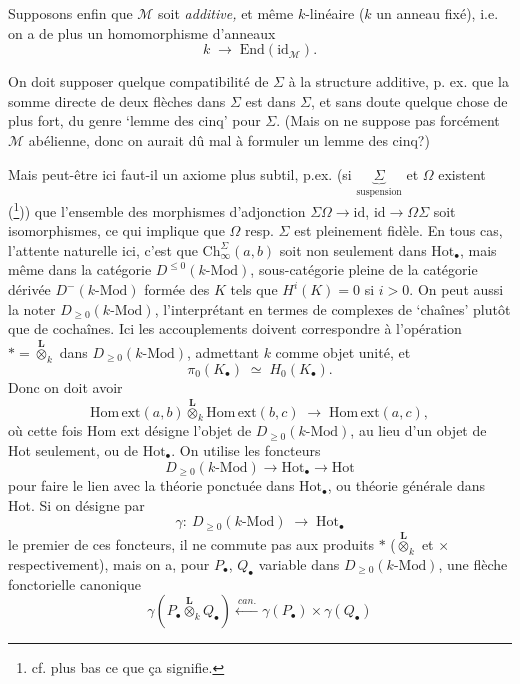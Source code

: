 \documentclass[11pt]{article}
\newcommand{\printedpage}[1]{\marginpar{\footnotesize p.~#1}}
\newcommand{\msp}[1]{\marginpar{\footnotesize [#1]}}
\newcommand{\Ch}{\mathrm{Ch}}
\newcommand{\Hot}{\mathrm{Hot}}
\newcommand{\M}{\mathcal{M}}
\newcommand{\Homext}{\mathrm{Hom\,ext}}
\newcommand{\Lotimes}{\overset{\mathbf{L}}{\otimes}}
\begin{document}
Supposons enfin que $\M$ soit \textit{additive,} et même $k$-linéaire ($k$ un anneau fixé), i.e. on a de plus un homomorphisme d'anneaux
\[
k \;\longrightarrow\; \mathrm{End}(\mathrm{id}_{\M}).
\]

On doit supposer quelque compatibilité de $\Sigma$ à la structure additive, p. ex. que la somme directe de deux flèches dans $\Sigma$ est dans $\Sigma$, et sans doute quelque chose de plus fort, du genre `lemme des cinq' pour $\Sigma$. (Mais on ne suppose pas forcément $\M$ abélienne, donc on aurait dû mal à formuler un lemme des cinq?) %

\msp{page 19}

Mais peut-être ici faut-il un axiome plus subtil, p.ex. (si $\underbrace{\Sigma}_{\text{suspension}}$ et $\Omega$ existent (\footnote[7]{cf. plus bas ce que ça signifie.})) que l'ensemble des morphismes d'adjonction $\Sigma\Omega \longrightarrow \mathrm{id}$, $\mathrm{id} \longrightarrow \Omega\Sigma$ soit isomorphismes, ce qui implique que $\Omega$ resp. $\Sigma$ est pleinement fidèle. En tous cas, l'attente naturelle ici, c'est que $\Ch^{\Sigma}_{\infty}(a,b)$ soit non seulement dans $\Hot_{\bullet}$, mais même dans la catégorie $D^{\leq 0}(k\text{-Mod})$, sous-catégorie pleine de la catégorie dérivée $D^{-}(k\text{-Mod})$ formée des $K$ tels que $H^{i}(K) = 0$ si $i > 0$. On peut aussi la noter $D_{\geq 0}(k\text{-Mod})$, l'interprétant en
\printedpage{12}
termes de complexes de `chaînes' plutôt que de cochaînes. Ici les accouplements doivent correspondre à l'opération $* = \Lotimes_k$ dans $D_{\geq 0}(k\text{-Mod})$, admettant $k$ comme objet unité, et
\[
\pi_0(K_{\bullet}) \;\simeq\; H_0(K_{\bullet}).
\]
Donc on doit avoir
\[
\Homext(a,b) \Lotimes_k \Homext(b,c) \;\longrightarrow\; \Homext(a,c),
\]
où cette fois Hom ext désigne l'objet de $D_{\geq 0}(k\text{-Mod})$, au lieu d'un objet de Hot seulement, ou de $\Hot_{\bullet}$. On utilise les foncteurs
\[
D_{\geq 0}(k\text{-Mod}) \longrightarrow \Hot_{\bullet} \longrightarrow \Hot
\]
\msp{page 20}
pour faire le lien avec la théorie ponctuée dans $\Hot_{\bullet}$, ou théorie générale dans Hot. Si on désigne par
\[
\gamma :\ D_{\geq 0}(k\text{-Mod}) \;\longrightarrow\; \Hot_{\bullet}
\]
le premier de ces foncteurs, il ne commute pas aux produits $*$ ($\Lotimes_k$ et $\times$ respectivement), mais on a, pour $P_{\bullet}$, $Q_{\bullet}$ variable dans $D_{\geq 0}(k\text{-Mod})$, une flèche fonctorielle canonique %
\[
\gamma(P_{\bullet} \Lotimes_k Q_{\bullet}) \xleftarrow{\ \mathit{can.}\ } \gamma(P_{\bullet})\times\gamma(Q_{\bullet})
\]
\end{document}
